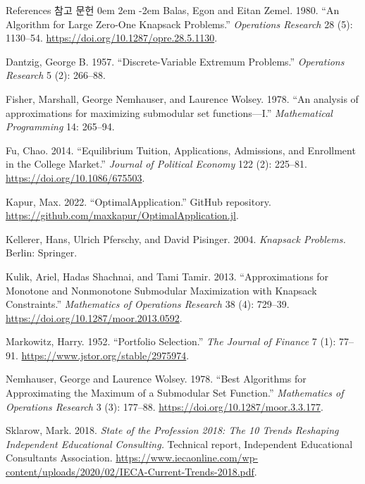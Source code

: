 \documentclass[11pt,mathserif,notheorems]{beamer}
\theoremstyle{definition}
\theoremstyle{definition}
\begin{document}
\begin{frame}[allowframebreaks]{\ifen References \else 참고 문헌 \fi}
\parskip 0em
\leftskip 2em
\parindent -2em
Balas, Egon and Eitan Zemel. 1980. ``An Algorithm for Large Zero-One Knapsack Problems.'' \emph{Operations Research} 28 (5): 1130--54. \url{https://doi.org/10.1287/opre.28.5.1130}. 

Dantzig, George B. 1957. ``Discrete-Variable Extremum Problems.'' \emph{Operations Research} 5 (2): 266--88.

Fisher, Marshall, George Nemhauser, and Laurence Wolsey. 1978. ``An analysis of approximations for maximizing submodular set functions—I.'' \emph{Mathematical Programming} 14: 265--94. 

Fu, Chao. 2014. ``Equilibrium Tuition, Applications, Admissions, and Enrollment in the College Market.'' \emph{Journal of Political Economy} 122 (2): 225--81. \url{https://doi.org/10.1086/675503}. 

Kapur, Max. 2022. ``OptimalApplication.'' GitHub repository. \url{https://github.com/maxkapur/OptimalApplication.jl}.


Kellerer, Hans, Ulrich Pferschy, and David Pisinger. 2004. \emph{Knapsack Problems.} Berlin: Springer.

\framebreak

Kulik, Ariel, Hadas Shachnai, and Tami Tamir. 2013. ``Approximations for Monotone and Nonmonotone Submodular Maximization with Knapsack Constraints.'' \emph{Mathematics of Operations Research} 38 (4): 729--39. \url{https://doi.org/10.1287/moor.2013.0592}.

Markowitz, Harry. 1952. ``Portfolio Selection.'' \emph{The Journal of Finance} 7 (1): 77--91. \url{https://www.jstor.org/stable/2975974}.

Nemhauser, George and Laurence Wolsey. 1978. ``Best Algorithms for Approximating the Maximum of a Submodular Set Function.'' \emph{Mathematics of Operations Research} 3 (3): 177--88. \url{https://doi.org/10.1287/moor.3.3.177}.


Sklarow, Mark. 2018. \emph{State of the Profession 2018: The 10 Trends Reshaping Independent Educational Consulting.} Technical report, Independent Educational Consultants Association. \url{https://www.iecaonline.com/wp-content/uploads/2020/02/IECA-Current-Trends-2018.pdf}.

\end{frame}
\end{document}
